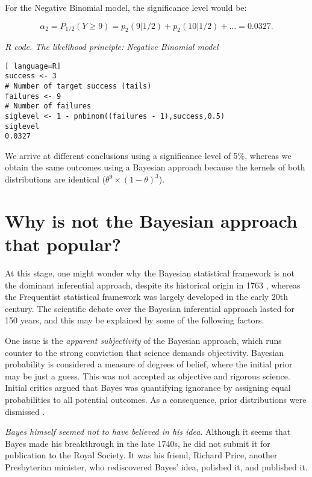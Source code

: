 For the Negative Binomial model, the significance level would be:

\begin{equation*}
	\alpha_2=P_{1/2}(Y\geq 9)=p_2(9|1/2)+p_2(10|1/2)+\ldots=0.0327.
\end{equation*}

\begin{tcolorbox}[enhanced,width=4.67in,center upper,
	fontupper=\large\bfseries,drop shadow southwest,sharp corners]
	\textit{R code. The likelihood principle: Negative Binomial model}
\begin{VF}
\begin{lstlisting}[ language=R]
success <- 3 
# Number of target success (tails)
failures <- 9 
# Number of failures
siglevel <- 1 - pnbinom((failures - 1),success,0.5)
siglevel
0.0327
\end{lstlisting}
\end{VF}
\end{tcolorbox}

We arrive at different conclusions using a significance level of 5\%, whereas we obtain the same outcomes using a Bayesian approach because the kernels of both distributions are identical ($\theta^9 \times (1 - \theta)^3$).

\section{Why is not the Bayesian approach that popular?}\label{sec25}

At this stage, one might wonder why the Bayesian statistical framework is not the dominant inferential approach, despite its historical origin in 1763 \cite{bayes1763lii}, whereas the Frequentist statistical framework was largely developed in the early 20th century. The scientific debate over the Bayesian inferential approach lasted for 150 years, and this may be explained by some of the following factors.

One issue is the \textit{apparent subjectivity} of the Bayesian approach, which runs counter to the strong conviction that science demands objectivity. Bayesian probability is considered a measure of degrees of belief, where the initial prior may be just a guess. This was not accepted as objective and rigorous science. Initial critics argued that Bayes was quantifying ignorance by assigning equal probabilities to all potential outcomes. As a consequence, prior distributions were dismissed \cite{mcgrayne2011theory}.

\textit{Bayes himself seemed not to have believed in his idea}. Although it seems that Bayes made his breakthrough in the late 1740s, he did not submit it for publication to the Royal Society. It was his friend, Richard Price, another Presbyterian minister, who rediscovered Bayes' idea, polished it, and published it.


